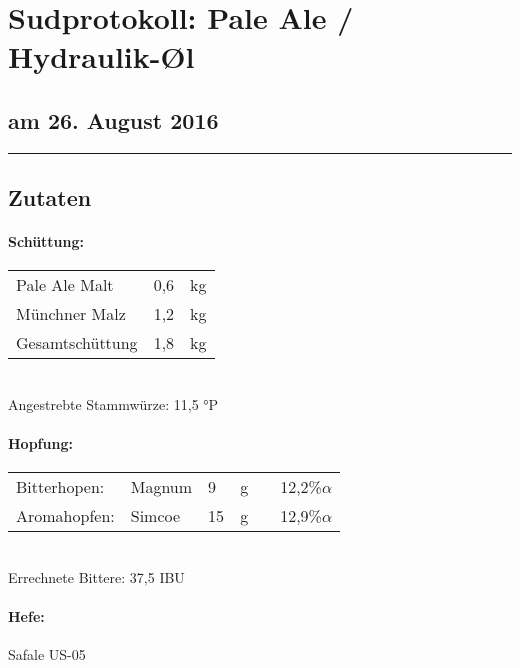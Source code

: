 \documentclass[12pt,oneside,a4paper]{scrartcl}
\begin{document}
	\begin{minipage}[c]{0.70\textwidth}
		\section*{\hspace{-.4cm}Sudprotokoll: Pale Ale / Hydraulik-\O{}l}
	\end{minipage}
	\begin{minipage}[c]{0.29\textwidth}
		\subsection*{am 26. August 2016}
	\end{minipage}
	\rule{\textwidth}{1pt}
%
\subsection*{Zutaten}
%
\paragraph{Schüttung:}
	\begin{tabular}[t]{m{8cm} m{2cm} m{1cm}}
		Pale Ale Malt & 0,6 & kg \bigstrut\\
		Münchner Malz & 1,2 & kg \bigstrut\\\hline
		Gesamtschüttung & 1,8 & kg\bigstrut
	\end{tabular}\\

\vspace{.25cm}
\hspace{1cm}Angestrebte Stammwürze: 11,5 °P
%
\paragraph{Hopfung:}
	\begin{tabular}[t]{m{2.5cm} m{5cm} m{0.5cm} m{1cm} m{0.5cm} m{1cm}}
		Bitterhopen: & Magnum & 9 & g &  & 12,2\%$\alpha$ \\%
		Aromahopfen: & Simcoe & 15 & g &  & 12,9\%$\alpha$%
	\end{tabular}\\

\vspace{.25cm}
\hspace{1cm}Errechnete Bittere: 37,5 IBU
%
\paragraph{Hefe:}
	Safale US-05
\end{document}
